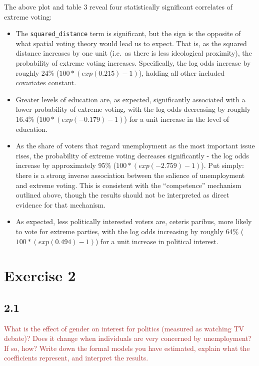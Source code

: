 \documentclass[
]{article}
\begin{document}
The above plot and table 3 reveal four statistically significant
correlates of extreme voting:

\begin{itemize}
\item
  The \texttt{squared\_distance} term is significant, but the sign is
  the opposite of what spatial voting theory would lead us to expect.
  That is, as the squared distance increases by one unit (i.e.~as there
  is less ideological proximity), the probability of extreme voting
  increases. Specifically, the log odds increase by roughly 24\%
  (\(100*(exp(0.215)-1)\)), holding all other included covariates
  constant.
\item
  Greater levels of education are, as expected, significantly associated
  with a lower probability of extreme voting, with the log odds
  decreasing by roughly 16.4\% (\(100*(exp(-0.179)-1)\)) for a unit
  increase in the level of education.
\item
  As the share of voters that regard unemployment as the most important
  issue rises, the probability of extreme voting decreases significantly
  - the log odds increase by approximately 95\%
  (\(100*(exp(-2.759)-1)\)). Put simply: there is a strong inverse
  association between the salience of unemployment and extreme voting.
  This is consistent with the ``competence'' mechanism outlined above,
  though the results should not be interpreted as direct evidence for
  that mechanism.
\item
  As expected, less politically interested voters are, ceteris paribus,
  more likely to vote for extreme parties, with the log odds increasing
  by roughly 64\% (\(100*(exp(0.494)-1)\)) for a unit increase in
  political interest.
\end{itemize}

\hypertarget{exercise-2}{%
\section{Exercise 2}\label{exercise-2}}

\hypertarget{section-3}{%
\subsection{2.1}\label{section-3}}

\textcolor{brown}{What is the effect of gender on interest for politics (measured as watching TV debate)? Does it change when individuals are very concerned by unemployment? If so, how? Write down the formal models you have estimated, explain what the coefficients represent, and interpret the results.}
\end{document}
